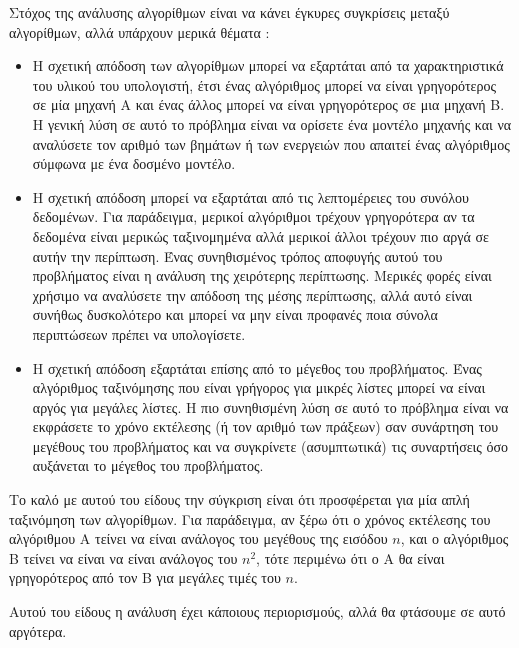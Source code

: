 \documentclass[10pt]{book}
\begin{document}
Στόχος της ανάλυσης αλγορίθμων είναι να κάνει έγκυρες συγκρίσεις μεταξύ αλγορίθμων, αλλά υπάρχουν μερικά θέματα : 

\begin{itemize}

\item Η σχετική απόδοση των αλγορίθμων μπορεί να εξαρτάται από τα χαρακτηριστικά 
του υλικού του υπολογιστή, έτσι ένας αλγόριθμος μπορεί να είναι γρηγορότερος σε μία 
μηχανή Α και ένας άλλος μπορεί να είναι γρηγορότερος σε μια μηχανή Β.  Η γενική λύση σε αυτό το πρόβλημα είναι να ορίσετε ένα μοντέλο μηχανής και να αναλύσετε τον 
αριθμό των βημάτων ή των ενεργειών που απαιτεί ένας αλγόριθμος σύμφωνα με ένα δοσμένο μοντέλο.

\item Η σχετική απόδοση μπορεί να εξαρτάται από τις λεπτομέρειες του  συνόλου δεδομένων.  Για παράδειγμα, μερικοί αλγόριθμοι τρέχουν γρηγορότερα αν τα δεδομένα 
είναι μερικώς ταξινομημένα αλλά μερικοί άλλοι τρέχουν πιο αργά σε αυτήν την περίπτωση.  Ένας συνηθισμένος τρόπος αποφυγής αυτού του προβλήματος είναι η ανάλυση της χειρότερης περίπτωσης.  Μερικές φορές είναι χρήσιμο να αναλύσετε την απόδοση της μέσης περίπτωσης, αλλά αυτό είναι συνήθως δυσκολότερο και μπορεί να μην είναι προφανές ποια σύνολα περιπτώσεων πρέπει να υπολογίσετε.

\item Η σχετική απόδοση εξαρτάται επίσης από το μέγεθος του προβλήματος.  
Ένας αλγόριθμος ταξινόμησης που είναι γρήγορος για μικρές λίστες μπορεί να είναι 
αργός για μεγάλες λίστες. Η πιο συνηθισμένη λύση σε αυτό το πρόβλημα είναι να εκφράσετε το χρόνο εκτέλεσης (ή τον αριθμό των πράξεων) σαν συνάρτηση του μεγέθους 
του προβλήματος και να συγκρίνετε (ασυμπτωτικά) τις συναρτήσεις όσο αυξάνεται το μέγεθος του προβλήματος.

\end{itemize}

Το καλό με αυτού του είδους την σύγκριση είναι ότι προσφέρεται για μία απλή ταξινόμηση των αλγορίθμων.  Για παράδειγμα, αν ξέρω ότι ο χρόνος εκτέλεσης του 
αλγόριθμου Α τείνει να είναι ανάλογος του μεγέθους της εισόδου $n$, και ο αλγόριθμος Β τείνει να είναι να είναι ανάλογος του  $n^2$,  τότε περιμένω ότι 
ο Α θα είναι γρηγορότερος από τον Β για μεγάλες τιμές του  $n$.

 Αυτού του είδους η ανάλυση έχει κάποιους περιορισμούς, αλλά θα φτάσουμε σε αυτό 
αργότερα.
\end{document}
